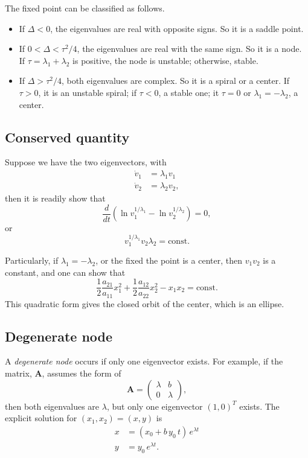\documentclass{book}
\begin{document}
The fixed point can be classified as follows.

\begin{itemize}

\item
If $\Delta < 0$, the eigenvalues are real with opposite signs.  So it is a saddle point.

\item
If $0 < \Delta < \tau^2/4$, the eigenvalues are real with the same sign.  So it is a node.  If $\tau = \lambda_1 + \lambda_2$ is positive, the node is unstable; otherwise, stable.

\item
If $\Delta > \tau^2/4$, both eigenvalues are complex.  So it is a spiral or a center.  If $\tau > 0$, it is an unstable spiral; if $\tau < 0$, a stable one; it $\tau = 0$ or $\lambda_1 = -\lambda_2$, a center.

\end{itemize}



\subsection{Conserved quantity}


Suppose we have the two eigenvectors, with
$$
\begin{aligned}
  \dot v_1 &= \lambda_1 v_1 \\
  \dot v_2 &= \lambda_2 v_2,
\end{aligned}
$$
then it is readily show that
$$
\frac{d}{dt} (\ln v_1^{1/\lambda_1} - \ln v_2^{1/\lambda_2}) = 0,
$$
or
$$
v_1^{1/\lambda_1} v_2 \lambda_2 = \mathrm{const.}
$$


Particularly, if $\lambda_1 = -\lambda_2$,
or the fixed the point is a center,
then $v_1 v_2$ is a constant,
and one can show that
$$
\frac{1}{2} \frac{a_{21}}{a_{11}} x_1^2
+\frac{1}{2} \frac{a_{12}}{a_{22}} x_2^2
-x_1 x_2 = \mathrm{const.}
$$
This quadratic form gives the closed orbit of the center,
which is an ellipse.


\subsection{Degenerate node}


A \emph{degenerate node} occurs if only one eigenvector exists.  For example, if the matrix, $\mathbf A$, assumes the form of
$$
\mathbf A =
\left(
  \begin{array}{cc}
    \lambda & b \\
    0 & \lambda
  \end{array}
\right),
$$
then both eigenvalues are $\lambda$, but only one eigenvector $(1, 0)^T$ exists.
The explicit solution for $(x_1, x_2) = (x, y)$ is
\begin{equation}
\begin{aligned}
  x &= (x_0 + b \, y_0 \, t) \, e^{\lambda t} \\
  y &= y_0 \, e^{\lambda t}.
\end{aligned}
\label{eq:degenode}
\end{equation}
\end{document}
